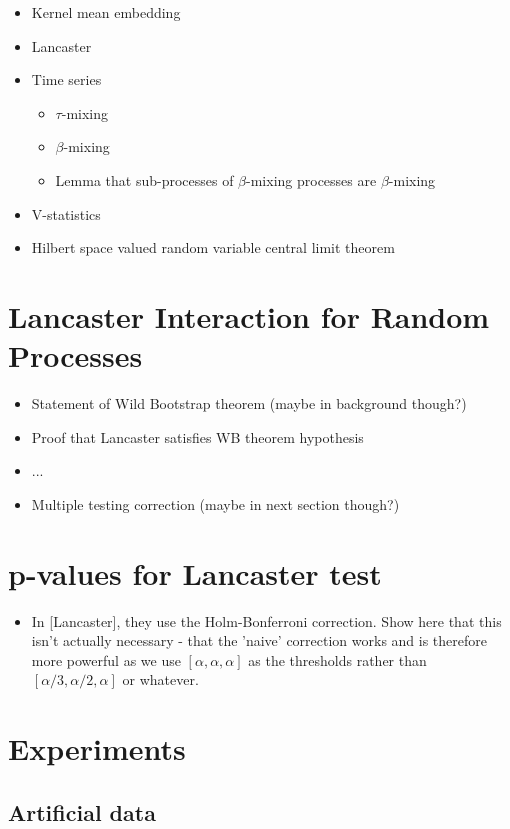 \documentclass{article}
\begin{document}
\begin{itemize}
\item Kernel mean embedding
\item Lancaster
\item Time series
\begin{itemize}
\item $\tau$-mixing
\item $\beta$-mixing
\item Lemma that sub-processes of $\beta$-mixing processes are $\beta$-mixing
\end{itemize}
\item V-statistics
\item Hilbert space valued random variable central limit theorem
\end{itemize} 

\section{Lancaster Interaction for Random Processes}
\begin{itemize}
\item Statement of Wild Bootstrap theorem (maybe in background though?)
\item Proof that Lancaster satisfies WB theorem hypothesis
\item ...
\item Multiple testing correction (maybe in next section though?)
\end{itemize}

\section{p-values for Lancaster test}
\begin{itemize}
\item In [Lancaster], they use the Holm-Bonferroni correction. Show here that this isn't actually necessary - that the 'naive' correction works and is therefore more powerful as we use $[\alpha,\alpha,\alpha]$ as the thresholds rather than $[\alpha/3,\alpha/2,\alpha]$ or whatever.	
\end{itemize}


\section{Experiments}
\subsection{Artificial data}
\end{document}
